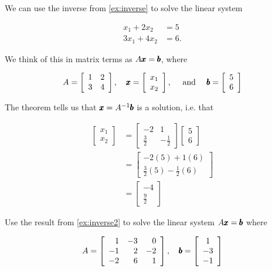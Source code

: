 \begin{example}
We can use the inverse from \autoref{ex:inverse} to solve the linear system

\[
\begin{aligned}
x_1+2 x_2 & =5 \\
3 x_1+4 x_2 & =6 .
\end{aligned}
\]

We think of this in matrix terms as \(A \pmb{x}=\pmb{b}\), where

\[
A=\left[\begin{array}{ll}
1 & 2 \\
3 & 4
\end{array}\right], \quad \pmb{x}=\left[\begin{array}{l}
x_1 \\
x_2
\end{array}\right], \quad \text { and } \quad \pmb{b}=\left[\begin{array}{l}
5 \\
6
\end{array}\right]
\]

The theorem tells us that \(\pmb{x}=A^{-1} \pmb{b}\) is a solution, i.e. that

\[
\begin{aligned}
{\left[\begin{array}{l}
x_1 \\
x_2
\end{array}\right] } & =\left[\begin{array}{cc}
-2 & 1 \\
\frac{3}{2} & -\frac{1}{2}
\end{array}\right]\left[\begin{array}{l}
5 \\
6
\end{array}\right] \\
& =\left[\begin{array}{c}
-2(5)+1(6) \\
\frac{3}{2}(5)-\frac{1}{2}(6)
\end{array}\right] \\
& =\left[\begin{array}{c}
-4 \\
\frac{9}{2}
\end{array}\right]
\end{aligned}
\]
\end{example}

\begin{example} Use the result from \autoref{ex:inverse2} to solve the linear system $A \pmb{x} = \pmb{b}$ where

    \[A=\left[\begin{array}{rrr}1 & -3 & 0 \\ -1 & 2 & -2 \\ -2 & 6 & 1\end{array}\right], \quad \pmb{b}=\left[\begin{array}{c}1 \\ -3 \\ -1\end{array}\right]\]

\end{example}

